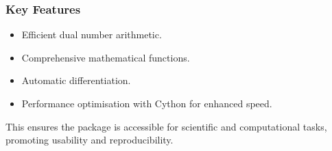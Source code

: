 \documentclass[a4paper,12pt]{article}
\begin{document}
\subsubsection{Key Features}
\begin{itemize}
    \item Efficient dual number arithmetic.
    \item Comprehensive mathematical functions.
    \item Automatic differentiation.
    \item Performance optimisation with Cython for enhanced speed.
\end{itemize}

This ensures the package is accessible for scientific and computational tasks, promoting usability and reproducibility.





\printbibliography
\end{document}
